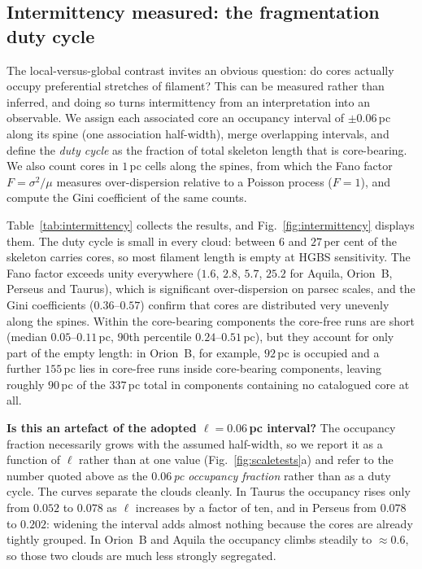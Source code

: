 \documentclass[usenatbib,twoside,twocolumn]{mnras}
\begin{document}
\subsection{Intermittency measured: the fragmentation duty cycle}
\label{sec:intermittency}

The local-versus-global contrast invites an obvious question: do cores actually occupy preferential stretches of filament? This can be measured rather than inferred, and doing so turns intermittency from an interpretation into an observable. We assign each associated core an occupancy interval of $\pm0.06$\,pc along its spine (one association half-width), merge overlapping intervals, and define the \emph{duty cycle} as the fraction of total skeleton length that is core-bearing. We also count cores in $1$\,pc cells along the spines, from which the Fano factor $F=\sigma^2/\mu$ measures over-dispersion relative to a Poisson process ($F=1$), and compute the Gini coefficient of the same counts.

Table~\ref{tab:intermittency} collects the results, and Fig.~\ref{fig:intermittency} displays them. The duty cycle is small in every cloud: between $6$ and $27$\,per cent of the skeleton carries cores, so most filament length is empty at HGBS sensitivity. The Fano factor exceeds unity everywhere ($1.6$, $2.8$, $5.7$, $25.2$ for Aquila, Orion~B, Perseus and Taurus), which is significant over-dispersion on parsec scales, and the Gini coefficients ($0.36$--$0.57$) confirm that cores are distributed very unevenly along the spines. Within the core-bearing components the core-free runs are short (median $0.05$--$0.11$\,pc, $90$th percentile $0.24$--$0.51$\,pc), but they account for only part of the empty length: in Orion~B, for example, $92$\,pc is occupied and a further $155$\,pc lies in core-free runs inside core-bearing components, leaving roughly $90$\,pc of the $337$\,pc total in components containing no catalogued core at all.

\smallskip\noindent\textbf{Is this an artefact of the adopted $\ell=0.06$\,pc interval?} The occupancy fraction necessarily grows with the assumed half-width, so we report it as a function of $\ell$ rather than at one value (Fig.~\ref{fig:scaletests}a) and refer to the number quoted above as the \emph{$0.06$\,pc occupancy fraction} rather than as a duty cycle. The curves separate the clouds cleanly. In Taurus the occupancy rises only from $0.052$ to $0.078$ as $\ell$ increases by a factor of ten, and in Perseus from $0.078$ to $0.202$: widening the interval adds almost nothing because the cores are already tightly grouped. In Orion~B and Aquila the occupancy climbs steadily to $\approx0.6$, so those two clouds are much less strongly segregated. 
\end{document}
